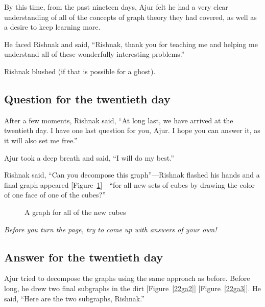 By this time, from the past nineteen days, Ajur felt he had a very clear understanding of all of the concepts of graph theory they had covered, as well as a desire to keep learning more.

He faced Rishnak and said, ``Rishnak, thank you for teaching me and helping me understand all of these wonderfully interesting problems.''

Rishnak blushed (if that is possible for a ghost).

\subsection*{Question for the twentieth day}
After a few moments, Rishnak said, ``At long last, we have arrived at the twentieth day. I have one last question for you, Ajur. I hope you can answer it, as it will also set me free.''

Ajur took a deep breath and said, ``I will do my best.''

Rishnak said, ``Can you decompose this graph''---Rishnak flashed his hands and a final graph appeared [Figure~\ref{22gq1}]---``for all new sets of cubes by drawing the color of one face of one of the cubes?''

\begin{figure}[h]
\begin{center}
\caption{A graph for all of the new cubes}\label{22gq1}
\end{center}
\end{figure}

\textit{Before you turn the page, try to come up with answers of your own!}

\newpage
\subsection*{Answer for the twentieth day}
Ajur tried to decompose the graphs using the same approach as before.
Before long, he drew two final subgraphs in the dirt [Figure~\ref{22ga2}] [Figure~\ref{22ga3}].
He said, ``Here are the two subgraphs, Rishnak.''

